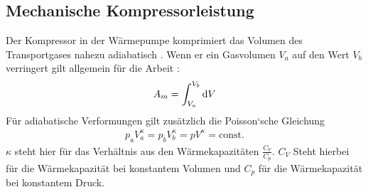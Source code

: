  \subsection{Mechanische Kompressorleistung}

Der Kompressor in der Wärmepumpe komprimiert das Volumen des Transportgases nahezu adiabatisch \cite[vgl.][]{man:v206}.
Wenn er ein Gasvolumen $V_a$ auf den Wert $V_b$ verringert gilt allgemein für die Arbeit \cite[vgl.][]{man:v206}:
\begin{align}
    A_m = \int_{V_a}^{V_b} \mathop{}\!\mathrm{d} V
\end{align}
Für adiabatische Verformungen gilt zusätzlich die Poisson`sche Gleichung
\begin{align}
    p_a V_{a}^{\kappa} = p_{b} V_{b}^{\kappa} = p V^{\kappa} = \mathrm{const.}
\end{align}
$\kappa$ steht hier für das Verhältnis aus den Wärmekapazitäten $\frac{C_V}{C_p}$.
$C_V$ Steht hierbei für die Wärmekapazität bei konstantem Volumen und $C_p$ für die Wärmekapazität bei konstantem Druck.
